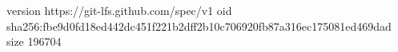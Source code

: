 version https://git-lfs.github.com/spec/v1
oid sha256:fbe9d0fd18ed442dc451f221b2dff2b10c706920fb87a316ec175081ed469dad
size 196704
